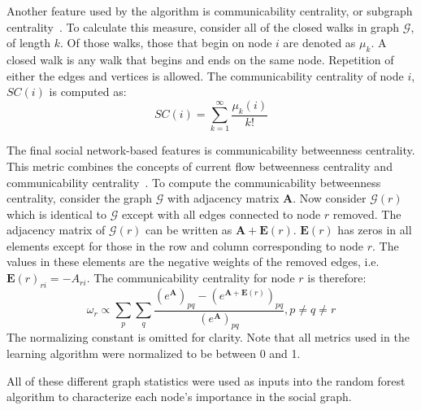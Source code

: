 \documentclass[12pt]{report}
\begin{document}
Another feature used by the algorithm is communicability centrality, or subgraph centrality~\cite{Estrada_2005}.  
To calculate this measure, consider all of the closed walks in graph $\mathcal{G}$, of length $k$.
Of those walks, those that begin on node $i$ are denoted as $\mu_k$.
A closed walk is any walk that begins and ends on the same node.
Repetition of either the edges and vertices is allowed.
The communicability centrality of node $i$, $SC(i)$ is computed as:
\begin{equation}
SC(i) = \sum_{k=1}^\infty \frac{\mu_k(i)}{k!}
\end{equation}

The final social network-based features is 
communicability betweenness centrality.
This metric combines the concepts of current flow betweenness centrality and communicability centrality~\cite{estrada2008communicability}.
To compute the communicability betweenness centrality, consider the graph $\mathcal{G}$  with adjacency matrix $\boldsymbol{A}$.
Now consider $\mathcal{G}(r)$ which is identical to $\mathcal{G}$ except with all edges connected to node $r$ removed.
The adjacency matrix of $\mathcal{G}(r)$ can be written as $\boldsymbol{A}+\boldsymbol{E}(r)$.
$\boldsymbol{E}(r)$ has zeros in all elements except for those in the row and column corresponding to node $r$.
The values in these elements are the negative weights of the removed edges, i.e. $\boldsymbol{E}(r)_{ri} = -A_{ri}$.
The communicability centrality for node $r$ is therefore:
\begin{equation}
\omega_r \propto \sum_{p}\sum_{q} \frac{\left(e^{\boldsymbol{A}} \right)_{pq} - \left(e^{\boldsymbol{A}+\boldsymbol{E}(r)} \right)_{pq}}{\left(e^{\boldsymbol{A}}\right)_{pq}}, p\neq q \neq r
\end{equation}
The normalizing constant is omitted for clarity.
Note that all metrics used in the learning algorithm were normalized to be between 0 and 1.

All of these different graph statistics were used as inputs into the random forest algorithm to characterize each node's importance in the social graph.
\end{document}
